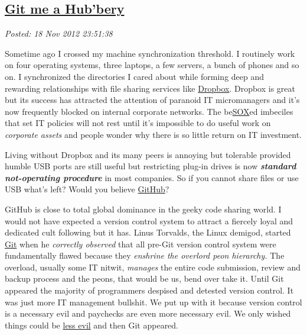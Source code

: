 %

\subsection*{\href{http://bakerjd99.wordpress.com/2012/11/18/git-me-a-hubbery/}{Git me a Hub'bery}}


\noindent\emph{Posted: 18 Nov 2012 23:51:38}
\vspace{6pt}

Sometime ago I crossed my machine synchronization threshold. I routinely
work on four operating systems, three laptops, a few servers, a bunch of
phones and so on. I synchronized the directories I cared about while
forming deep and rewarding relationships with file sharing services like
\href{https://www.dropbox.com/}{Dropbox}. Dropbox is great but its
success has attracted the attention of paranoid IT micromanagers and
it's now frequently blocked on internal corporate networks. The
be\href{http://www.techdirt.com/articles/20070115/163130.shtml}{SOX}ed
imbeciles that set IT policies will not rest until it's impossible to do
useful work on \emph{corporate assets} and people wonder why there is so
little return on IT investment.

Living without Dropbox and its many peers is annoying but tolerable
provided humble USB ports are still useful but restricting plug-in
drives is now \textbf{\emph{standard not-operating procedure}} in
most companies. So if you cannot share files or use USB what's left?
Would you believe \href{https://github.com/}{GitHub}?

GitHub is close to total global dominance in the geeky code sharing
world. I would not have expected a version control system
to attract a fiercely loyal and dedicated cult following but it has.
Linus Torvalds, the Linux demigod, started
\href{http://git-scm.com/}{Git} when he \emph{correctly observed} that
all pre-Git version control system were fundamentally flawed because
they \emph{enshrine the overlord peon hierarchy.} The overload, usually
some IT nitwit, \emph{manages} the entire code submission, review and
backup process and the peons, that would be us, bend over take it. Until
Git appeared the majority of programmers despised and detested version
control. It was just more IT management bullshit. We put up with it
because version control is a necessary evil and paychecks are even more
necessary evil. We only wished things could be
\href{http://www.youtube.com/watch?v=w27meg0YfEU}{less evil} and then
Git appeared.

